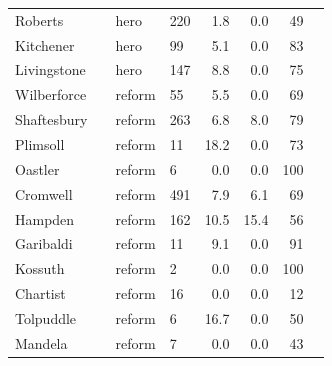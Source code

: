 \documentclass[11pt,a4paper]{article}
\begin{document}
\begin{small}
\begin{longtable}{llllrrrr}
Roberts &  & hero & 220 & 1.8 & 0.0 & 49 & \\
Kitchener &  & hero & 99 & 5.1 & 0.0 & 83 & \\
Livingstone &  & hero & 147 & 8.8 & 0.0 & 75 & \\
Wilberforce &  & reform & 55 & 5.5 & 0.0 & 69 & \\
Shaftesbury &  & reform & 263 & 6.8 & 8.0 & 79 & \\
Plimsoll &  & reform & 11 & 18.2 & 0.0 & 73 & \\
Oastler &  & reform & 6 & 0.0 & 0.0 & 100 & \\
Cromwell &  & reform & 491 & 7.9 & 6.1 & 69 & \\
Hampden &  & reform & 162 & 10.5 & 15.4 & 56 & \\
Garibaldi &  & reform & 11 & 9.1 & 0.0 & 91 & \\
Kossuth &  & reform & 2 & 0.0 & 0.0 & 100 & \\
Chartist &  & reform & 16 & 0.0 & 0.0 & 12 & \\
Tolpuddle &  & reform & 6 & 16.7 & 0.0 & 50 & \\
Mandela &  & reform & 7 & 0.0 & 0.0 & 43 & \\
\bottomrule\end{longtable}\end{small}
\end{document}
